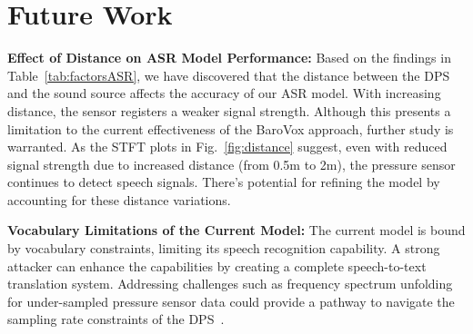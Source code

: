 
\section{Future Work}
\label{appendix:futureWork}

\textbf{Effect of Distance on ASR Model Performance:} Based on the findings in Table~\ref{tab:factorsASR}, we have discovered that the distance between the DPS and the sound source affects the accuracy of our ASR model. 
With increasing distance, the sensor registers a weaker signal strength. Although this presents a limitation to the current effectiveness of the BaroVox approach, further study is warranted. As the STFT plots in Fig.~\ref{fig:distance} suggest, even with reduced signal strength due to increased distance (from 0.5m to 2m), the pressure sensor continues to detect speech signals. There's potential for refining the model by accounting for these distance variations.

\textbf{Vocabulary Limitations of the Current Model:} The current model is bound by vocabulary constraints, limiting its speech recognition capability. A strong attacker can enhance the capabilities by creating a complete speech-to-text translation system. Addressing challenges such as frequency spectrum unfolding for under-sampled pressure sensor data could provide a pathway to navigate the sampling rate constraints of the DPS~\cite{nader2011harmonic, nader2011unfolding}.
 

